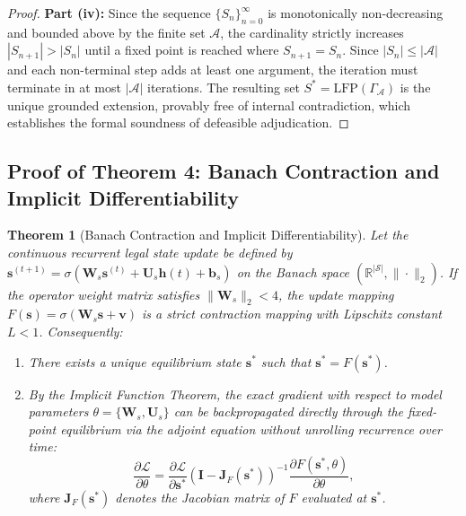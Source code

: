 \documentclass[11pt,a4paper]{article}
\newtheorem*{theorem*}{Theorem}
\begin{document}
\begin{proof}
\textbf{Part (iv):} Since the sequence $\{S_n\}_{n=0}^\infty$ is monotonically non-decreasing and bounded above by the finite set $\mathcal{A}$, the cardinality strictly increases $|S_{n+1}| > |S_n|$ until a fixed point is reached where $S_{n+1} = S_n$. Since $|S_n| \le |\mathcal{A}|$ and each non-terminal step adds at least one argument, the iteration must terminate in at most $|\mathcal{A}|$ iterations. The resulting set $S^* = \mathrm{LFP}(\Gamma_{\mathcal{A}})$ is the unique grounded extension, provably free of internal contradiction, which establishes the formal soundness of defeasible adjudication.
\end{proof}

\subsection{Proof of Theorem 4: Banach Contraction and Implicit Differentiability}
\label{proof:thm4}

\begin{theorem*}[Banach Contraction and Implicit Differentiability]
Let the continuous recurrent legal state update be defined by $\mathbf{s}^{(t+1)} = \sigma(\mathbf{W}_s \mathbf{s}^{(t)} + \mathbf{U}_s \mathbf{h}(t) + \mathbf{b}_s)$ on the Banach space $(\mathbb{R}^{|\mathcal{S}|}, \|\cdot\|_2)$. If the operator weight matrix satisfies $\|\mathbf{W}_s\|_2 < 4$, the update mapping $F(\mathbf{s}) = \sigma(\mathbf{W}_s \mathbf{s} + \mathbf{v})$ is a strict contraction mapping with Lipschitz constant $L < 1$. Consequently:
\begin{enumerate}[label=(\roman*)]
    \item There exists a unique equilibrium state $\mathbf{s}^*$ such that $\mathbf{s}^* = F(\mathbf{s}^*)$.
    \item By the Implicit Function Theorem, the exact gradient with respect to model parameters $\theta = \{\mathbf{W}_s, \mathbf{U}_s\}$ can be backpropagated directly through the fixed-point equilibrium via the adjoint equation without unrolling recurrence over time:
    \begin{equation}
    \frac{\partial \mathcal{L}}{\partial \theta} = \frac{\partial \mathcal{L}}{\partial \mathbf{s}^*} \left( \mathbf{I} - \mathbf{J}_F(\mathbf{s}^*) \right)^{-1} \frac{\partial F(\mathbf{s}^*, \theta)}{\partial \theta},
    \end{equation}
    where $\mathbf{J}_F(\mathbf{s}^*)$ denotes the Jacobian matrix of $F$ evaluated at $\mathbf{s}^*$.
\end{enumerate}
\end{theorem*}
\end{document}
